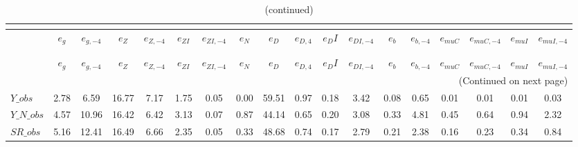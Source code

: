  
\begin{center}
\begin{longtable}{lccccccccccccccccc} 
\caption{VARIANCE DECOMPOSITION (in percent)}\\
 \label{Table:th_var_decomp_uncond}\\
\toprule 
$               $	 & 	 $           {e_g}$	 & 	 $      {e_{g,-4}}$	 & 	 $           {e_Z}$	 & 	 $      {e_{Z,-4}}$	 & 	 $        {e_{ZI}}$	 & 	 $     {e_{ZI,-4}}$	 & 	 $           {e_N}$	 & 	 $           {e_D}$	 & 	 $       {e_{D,4}}$	 & 	 $          {e_DI}$	 & 	 $     {e_{DI,-4}}$	 & 	 $           {e_b}$	 & 	 $      {e_{b,-4}}$	 & 	 $       {e_{muC}}$	 & 	 $    {e_{muC,-4}}$	 & 	 $       {e_{muI}}$	 & 	 $    {e_{muI,-4}}$\\
\midrule \endfirsthead 
\caption{(continued)}\\
 \toprule \\ 
$               $	 & 	 $           {e_g}$	 & 	 $      {e_{g,-4}}$	 & 	 $           {e_Z}$	 & 	 $      {e_{Z,-4}}$	 & 	 $        {e_{ZI}}$	 & 	 $     {e_{ZI,-4}}$	 & 	 $           {e_N}$	 & 	 $           {e_D}$	 & 	 $       {e_{D,4}}$	 & 	 $          {e_DI}$	 & 	 $     {e_{DI,-4}}$	 & 	 $           {e_b}$	 & 	 $      {e_{b,-4}}$	 & 	 $       {e_{muC}}$	 & 	 $    {e_{muC,-4}}$	 & 	 $       {e_{muI}}$	 & 	 $    {e_{muI,-4}}$\\
\midrule \endhead 
\midrule \multicolumn{18}{r}{(Continued on next page)} \\ \bottomrule \endfoot 
\bottomrule \endlastfoot 
$Y\_obs         $	 & 	            2.78	 & 	            6.59	 & 	           16.77	 & 	            7.17	 & 	            1.75	 & 	            0.05	 & 	            0.00	 & 	           59.51	 & 	            0.97	 & 	            0.18	 & 	            3.42	 & 	            0.08	 & 	            0.65	 & 	            0.01	 & 	            0.01	 & 	            0.01	 & 	            0.03 \\ 
$Y\_N\_obs      $	 & 	            4.57	 & 	           10.96	 & 	           16.42	 & 	            6.42	 & 	            3.13	 & 	            0.07	 & 	            0.87	 & 	           44.14	 & 	            0.65	 & 	            0.20	 & 	            3.08	 & 	            0.33	 & 	            4.81	 & 	            0.45	 & 	            0.64	 & 	            0.94	 & 	            2.32 \\ 
$SR\_obs        $	 & 	            5.16	 & 	           12.41	 & 	           16.49	 & 	            6.66	 & 	            2.35	 & 	            0.05	 & 	            0.33	 & 	           48.68	 & 	            0.74	 & 	            0.17	 & 	            2.79	 & 	            0.21	 & 	            2.38	 & 	            0.16	 & 	            0.23	 & 	            0.34	 & 	            0.84 \\ 

\end{longtable}
\end{center}
